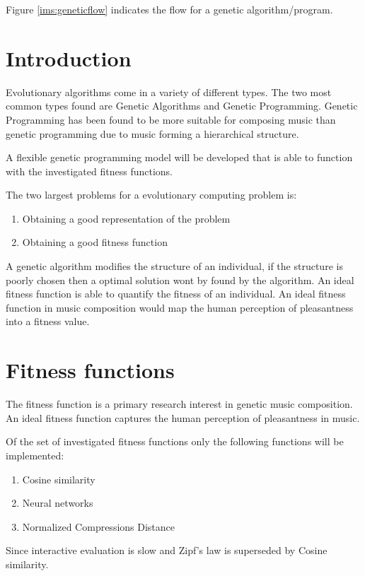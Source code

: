 Figure \ref{ims:geneticflow} indicates the flow for a genetic algorithm/program.

\section{Introduction}

Evolutionary algorithms come in a variety of different types. The two most common types found are Genetic Algorithms and Genetic Programming. Genetic Programming has been found to be more suitable for composing music than genetic programming due to music forming a hierarchical structure.

A flexible genetic programming model will be developed that is able to function with the investigated fitness functions. 

The two largest problems for a evolutionary computing problem is:
\begin{enumerate}
\item Obtaining a good representation of the problem
\item Obtaining a good fitness function
\end{enumerate}
A genetic algorithm modifies the structure of an individual, if the structure is poorly chosen then a optimal solution wont by found by the algorithm.
An ideal fitness function is able to quantify the fitness of an individual. An ideal fitness function in music composition would map the human perception of pleasantness into a fitness value. 

\section{Fitness functions}
The fitness function is a primary research interest in genetic music composition. An ideal fitness function captures the human perception of pleasantness in music.

Of the set of investigated fitness functions only the following functions will be implemented:
\begin{enumerate}
\item Cosine similarity
\item Neural networks
\item Normalized Compressions Distance
\end{enumerate}
Since interactive evaluation is slow and Zipf's law is superseded by Cosine similarity.

